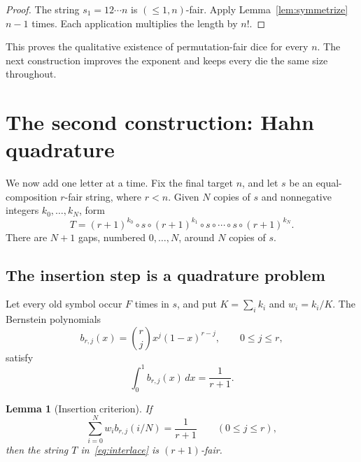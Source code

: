 \documentclass[11pt]{article}
\newtheorem{lemma}[theorem]{Lemma}
\theoremstyle{definition}
\theoremstyle{remark}
\newcommand{\concat}{\mathbin{\circ}}
\begin{document}
\begin{proof}
The string \(s_1=12\cdots n\) is \((\leq1,n)\)-fair.  Apply
Lemma~\ref{lem:symmetrize} \(n-1\) times.  Each application multiplies the
length by \(n!\).
\end{proof}

This proves the qualitative existence of permutation-fair dice for every
\(n\).  The next construction improves the exponent and keeps every die the
same size throughout.

\section{The second construction: Hahn quadrature}\label{sec:second}

We now add one letter at a time.  Fix the final target \(n\), and let \(s\) be
an equal-composition \(r\)-fair string, where \(r<n\).  Given \(N\) copies of
\(s\) and nonnegative integers \(k_0,\ldots,k_N\), form
\begin{equation}\label{eq:interlace}
 T=(r+1)^{k_0}\concat s\concat(r+1)^{k_1}\concat s\concat\cdots
   \concat s\concat(r+1)^{k_N}.
\end{equation}
There are \(N+1\) gaps, numbered \(0,\ldots,N\), around \(N\) copies of \(s\).

\subsection{The insertion step is a quadrature problem}

Let every old symbol occur \(F\) times in \(s\), and put
\(K=\sum_i k_i\) and \(w_i=k_i/K\).  The Bernstein
polynomials~\cite{lorentz1986}
\[
  b_{r,j}(x)=\binom rj x^j(1-x)^{r-j},\qquad 0\leq j\leq r,
\]
satisfy
\begin{equation}\label{eq:bernstein-integral}
  \int_0^1 b_{r,j}(x)\,dx=\frac1{r+1}.
\end{equation}

\begin{lemma}[Insertion criterion]\label{lem:insertion}
If
\begin{equation}\label{eq:insertion-moments}
  \sum_{i=0}^N w_i b_{r,j}(i/N)=\frac1{r+1}
  \qquad(0\leq j\leq r),
\end{equation}
then the string \(T\) in~\eqref{eq:interlace} is \((r+1)\)-fair.
\end{lemma}
\end{document}
